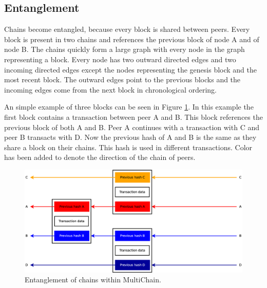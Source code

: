 \subsection{Entanglement}
Chains become entangled, because every block is shared between peers.
Every block is present in two chains and references the previous block of node A and of node B.
The chains quickly form a large graph with every node in the graph representing a block.
Every node has two outward directed edges and two incoming directed edges
except the nodes representing the genesis block and the most recent block.
The outward edges point to the previous blocks
and the incoming edges come from the next block in chronological ordering.

An simple example of three blocks can be seen in Figure \ref{fig:chain-example}.
In this example the first block contains a transaction between peer A and B.
This block references the previous block of both A and B.
Peer A continues with a transaction with C and peer B transacts with D.
Now the previous hash of A and B is the same as they share a block on their chains.
This hash is used in different transactions.
Color has been added to denote the direction of the chain of peers.

\begin{figure}[ht]
	\centerline{\includegraphics[scale=0.3]{design/figs/entangled-chain.eps}}
	\caption{Entanglement of chains within MultiChain.}
	\label{fig:chain-example}
\end{figure}


